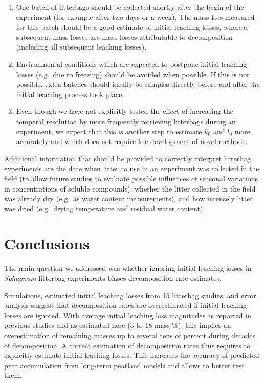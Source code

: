\documentclass[
  12pt,
]{article}
\begin{document}
\begin{enumerate}
\def\labelenumi{\arabic{enumi}.}
\item
  One batch of litterbags should be collected shortly after the begin of the experiment (for example after two days or a week). The mass loss measured for this batch should be a good estimate of initial leaching losses, whereas subsequent mass losses are mass losses attributable to decomposition (including all subsequent leaching losses).
\item
  Environmental conditions which are expected to postpone initial leaching losses (e.g.~due to freezing) should be avoided when possible. If this is not possible, extra batches should ideally be samples directly before and after the initial leaching process took place.
\item
  Even though we have not explicitly tested the effect of increasing the temperal resolution by more frequently retrieving litterbags during an experiment, we expect that this is another step to estimate \(k_0\) and \(l_0\) more accurately and which does not require the development of novel methods.
\end{enumerate}

Additional information that should be provided to correctly interpret litterbag experiments are the date when litter to use in an experiment was collected in the field (to allow future studies to evaluate possible influences of seasonal variations in concentrations of soluble compounds), whether the litter collected in the field was already dry (e.g.~as water content measurements), and how intensely litter was dried (e.g.~drying temperature and residual water content).

\hypertarget{conclusions}{%
\section{Conclusions}\label{conclusions}}

The main question we addressed was whether ignoring initial leaching losses in \emph{Sphagnum} litterbag experiments biases decomposition rate estimates.

Simulations, estimated initial leaching losses from 15 litterbag studies, and error analysis suggest that decomposition rates are overestimated if initial leaching losses are ignored. With average initial leaching loss magnitudes as reported in previous studies and as estimated here (3 to 18 mass-\%), this implies an overestimation of remaining masses up to several tens of percent during decades of decomposition. A correct estimation of decomposition rates thus requires to explicitly estimate initial leaching losses. This increases the accuracy of predicted peat accumulation from long-term peatland models and allows to better test them.
\end{document}
